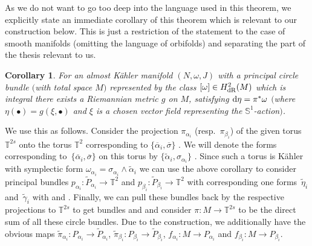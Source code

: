 \documentclass[10pt,a4paper]{amsart}
\numberwithin{equation}{section}
\newtheorem{cor}[tw]{Corollary}
\theoremstyle{definition}
\begin{document}
As we do not want to go too deep into the language used in this theorem, we explicitly state an immediate corollary of this theorem which is relevant to our construction below. This is just a restriction of the statement to the case of smooth manifolds (omitting the language of orbifolds) and separating the part of the thesis relevant to us.

\begin{cor} For an almost K\"ahler manifold $(N,\omega,J)$ with a principal circle bundle $($with total space $M)$ represented by the class $[\omega]\in H^2_{\rm dR}(M)$ which is integral there exists a Riemannian metric $g$ on $M$, satisfying ${\rm d}\eta=\pi^*\omega$ $($where $\eta(\bullet)=g(\xi,\bullet)$ and $\xi$ is a chosen vector field representing the $\mathbb{S}^1$-action$)$.
\end{cor}
We use this as follows. Consider the projection $\pi_{\alpha_i}$ (resp.\ $\pi_{\beta_i}$) of the given torus $\mathbb{T}^{2s}$ onto the torus $\mathbb{T}^2$ corresponding to $\{\overline{\alpha}_i,\overline{\sigma}\}$ . We will denote the forms corresponding to~$\{\overline{\alpha}_i,\overline{\sigma}\}$  on this torus by $\{\tilde{\alpha}_i,\sigma_{\alpha_i}\}$ . Since such a torus is K\"ahler with symplectic form $\omega_{\alpha_i}=\sigma_{\alpha_i}\wedge\tilde{\alpha}_i$  we can use the above corollary to consider principal bundles $p_{\alpha_i}\colon \tilde{P}_{\alpha_i}\to\mathbb{T}^2$ and $p_{\beta_i}\colon \tilde{P}_{\beta_i}\to\mathbb{T}^2$ with corresponding one forms~$\tilde{\eta}_i$ and~$\tilde{\gamma}_i$ with  and . Finally, we can pull these bundles back by the respective projections to $\mathbb{T}^{2s}$ to get bundles  and  and consider ${\pi\colon M\to\mathbb{T}^{2s}}$ to be the direct sum of all these circle bundles. Due to the construction, we additionally have the obvious maps $\tilde{\pi}_{\alpha_i}\colon P_{\alpha_i}\to\tilde{P}_{\alpha_i}$, $\tilde{\pi}_{\beta_i}\colon P_{\beta_i}\to\tilde{P}_{\beta_i}$, $f_{\alpha_i}\colon M\to P_{\alpha_i}$ and $f_{\beta_i}\colon M\to P_{\beta_i}$.
\end{document}
